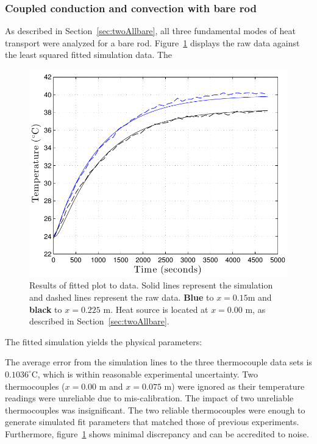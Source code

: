 \documentclass[10pt,aps,prb,twocolumn, nofootinbib]{revtex4-1}
\begin{document}
\subsubsection{\label{sec:threeAllbare}Coupled conduction and convection with bare rod}

As described in Section~\ref{sec:twoAllbare}, all three fundamental modes of heat transport were analyzed for a bare rod. Figure~\ref{fig:allThreeBare} displays the raw data against the least squared fitted simulation data. The 

\begin{figure}[h!]
\centering
\includegraphics[width=1.0\linewidth]{allThreeBare}
\caption{Results of fitted plot to data. Solid lines represent the simulation and dashed lines represent the raw data. {\color{blue}\textbf{Blue}} to $x = 0.15$m and \textbf{black} to $x = 0.225$ m. Heat source is located at $x= 0.00$ m, as described in Section~\ref{sec:twoAllbare}.}
\label{fig:allThreeBare}
\end{figure}

The fitted simulation yields the physical parameters:
\bigskip
\begin{center}
\end{center}
The average error from the simulation lines to the three thermocouple data sets is $0.1036 ^\circ$C, which is within reasonable experimental uncertainty. Two thermocouples ($x = 0.00 \text{ m}$ and $x = 0.075 \text{ m}$) were ignored as their temperature readings were unreliable due to mis-calibration. The impact of two unreliable thermocouples was insignificant. The two reliable thermocouples were enough to generate simulated fit parameters that matched those of previous experiments. Furthermore, figure~\ref{fig:allThreeBare} shows minimal discrepancy and can be accredited to noise.
\end{document}
